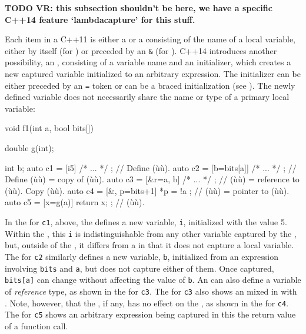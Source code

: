 \textbf{TODO VR: this subsection shouldn't be here, we have a specific C++14
feature `lambdacapture' for this stuff.}

Each item in a C++11  is either a  or a  consisting of the name of a local
variable, either by itself (for ) or preceded by
an \lstinline!&! (for ). C++14 introduces
another possibility, an , consisting of a variable
name and an initializer, which creates a new captured variable
initialized to an arbitrary expression. The initializer can be either
preceded by an \lstinline!=! token or can be a braced initialization (see
). The newly defined variable does
not necessarily share the name or type of a primary local variable:

\begin{emcppslisting}
void f1(int a, bool bits[])
{
    double g(int);

    int b;
    auto c1 = [i{5}]{ /* ... */ };        // Define (ù{}ù).
    auto c2 = [b=bits[a]]{ /* ... */ };   // Define (ù{}ù) = copy of (ù{}ù).
    auto c3 = [&r=a, b]{ /* ... */ };     // (ù{}ù) = reference to (ù{}ù). Copy (ù{}ù).
    auto c4 = [&, p=bits+1]{ *p = !a };   // (ù{}ù) = pointer to (ù{}ù).
    auto c5 = [x=g(a)]{ return x; };      // (ù{}ù).
}
\end{emcppslisting}
    

In the  for \lstinline!c1!, above, the
 defines a new variable, \lstinline!i!, initialized
with the value 5. Within the , this \lstinline!i! is
indistinguishable from any other variable captured by the
, but, outside of the , it differs
from a  in that it does not capture a local
variable. The  for \lstinline!c2! similarly defines
a new variable, \lstinline!b!, initialized from an expression involving
\lstinline!bits! and \lstinline!a!, but does not capture either of them. Once
captured, \lstinline!bits[a]! can change without affecting the value of
\lstinline!b!. An  can also define a variable of
\emph{reference} type, as shown in the  for
\lstinline!c3!. The  for \lstinline!c3! also shows an
 mixed in with . Note,
however, that the , if any, has no effect on the
, as shown in the  for
\lstinline!c4!. The  for \lstinline!c5! shows an
arbitrary expression being captured in this the return value of a
function call.


